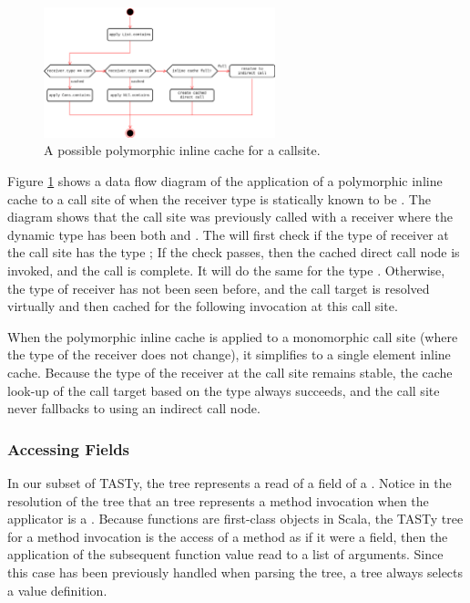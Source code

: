 \begin{figure}[!htb]
	\centering
	\includegraphics[width=0.6\textwidth]{figures/tastytruffle-pic-example.png}
	\caption{A possible polymorphic inline cache for a  callsite.}
	\label{example:poly-cache-call-node}
\end{figure}

Figure \ref{example:poly-cache-call-node} shows a data flow diagram of the application of a polymorphic inline cache to a call site of  when the receiver type is statically known to be . 
The diagram shows that the call site was previously called with a receiver where the dynamic type has been both  and .
The  will first check if the type of receiver at the call site has the type ; If the check passes, then the cached direct call node is invoked, and the call is complete.
It will do the same for the type .
Otherwise, the type of receiver has not been seen before, and the call target is resolved virtually and then cached for the following invocation at this call site.

When the polymorphic inline cache is applied to a monomorphic call site (where the type of the receiver does not change), it simplifies to a single element inline cache\cite{smalltalk:inline-caches}. 
Because the type of the receiver at the call site remains stable, the cache look-up of the call target based on the type always succeeds, and the call site never fallbacks to using an indirect call node.

\subsubsection*{Accessing Fields}

In our subset of TASTy, the  tree represents a read of a field of a .
Notice in the resolution of the  tree that an  tree represents a method invocation when the applicator is a .
Because functions are first-class objects in Scala, the TASTy tree for a method invocation is the access of a method as if it were a field, then the application of the subsequent function value read to a list of arguments.
Since this case has been previously handled when parsing the  tree, a  tree always selects a value definition.

